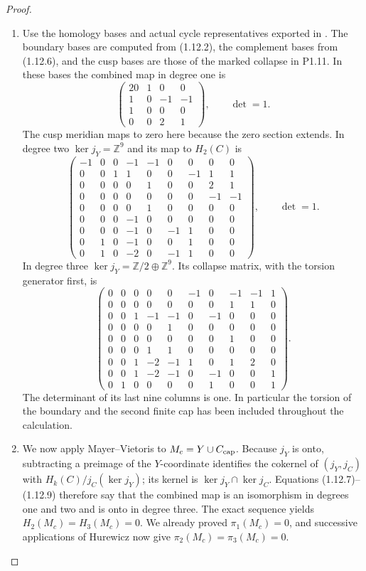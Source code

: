\begin{proof}
\begin{enumerate}[label=\arabic*.]
\item Use the homology bases and actual cycle representatives exported in
.
The boundary bases are computed from (1.12.2), the complement bases
from (1.12.6), and the cusp bases are those of the marked collapse
in P1.11.  In these bases the combined map in degree one is
\[
\begin{pmatrix}20&1&0&0\\1&0&-1&-1\\1&0&0&0\\0&0&2&1\end{pmatrix},
\qquad\det=1.
\tag{1.12.7}
\]
The cusp meridian maps to zero here because the zero section extends.
In degree two $\ker j_Y=\mathbb Z^9$ and its map to $H_2(C)$ is
\[
\begin{pmatrix}
-1&0&0&-1&-1&0&0&0&0\\
0&0&1&1&0&0&-1&1&1\\
0&0&0&0&1&0&0&2&1\\
0&0&0&0&0&0&0&-1&-1\\
0&0&0&0&1&0&0&0&0\\
0&0&0&-1&0&0&0&0&0\\
0&0&0&-1&0&-1&1&0&0\\
0&1&0&-1&0&0&1&0&0\\
0&1&0&-2&0&-1&1&0&0
\end{pmatrix},\qquad\det=1.
\tag{1.12.8}
\]
In degree three $\ker j_Y=\mathbb Z/2\oplus\mathbb Z^9$.
Its collapse matrix, with the torsion generator first, is
\[
\begin{pmatrix}
0&0&0&0&0&-1&0&-1&-1&1\\
0&0&0&0&0&0&0&1&1&0\\
0&0&1&-1&-1&0&-1&0&0&0\\
0&0&0&0&1&0&0&0&0&0\\
0&0&0&0&0&0&0&1&0&0\\
0&0&0&1&1&0&0&0&0&0\\
0&0&1&-2&-1&1&0&1&2&0\\
0&0&1&-2&-1&0&-1&0&0&1\\
0&1&0&0&0&0&1&0&0&1
\end{pmatrix}.
\tag{1.12.9}
\]
The determinant of its last nine columns is one.  In particular the
torsion of the boundary and the second finite cap has been included
throughout the calculation.

\item We now apply Mayer--Vietoris to $M_c=Y\cup C_{\rm cap}$.
Because $j_Y$ is onto, subtracting a preimage of the $Y$-coordinate
identifies the cokernel of $(j_Y,j_C)$ with
$H_k(C)/j_C(\ker j_Y)$; its kernel is
$\ker j_Y\cap\ker j_C$.
Equations (1.12.7)--(1.12.9) therefore say that the combined map is an
isomorphism in degrees one and two and is onto in degree three.
The exact sequence yields $H_2(M_c)=H_3(M_c)=0$.
We already proved $\pi_1(M_c)=0$, and successive applications of
Hurewicz now give $\pi_2(M_c)=\pi_3(M_c)=0$.


\end{enumerate}
\end{proof}
